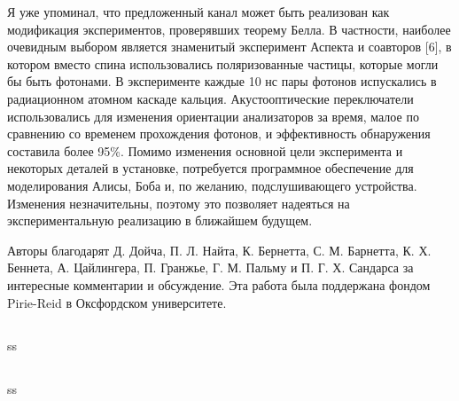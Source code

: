 Я уже упоминал, что предложенный канал может быть реализован как модификация экспериментов, проверявших теорему Белла. В частности, наиболее очевидным выбором является знаменитый эксперимент Аспекта и соавторов [6], в котором вместо спина использовались поляризованные частицы, которые могли бы быть фотонами. В эксперименте каждые 10 нс пары фотонов испускались в радиационном атомном каскаде кальция. Акустооптические переключатели использовались для изменения ориентации анализаторов за время, малое по сравнению со временем прохождения фотонов, и эффективность обнаружения составила более 95\%. Помимо изменения основной цели эксперимента и некоторых деталей в установке, потребуется программное обеспечение для моделирования Алисы, Боба и, по желанию, подслушивающего устройства. Изменения незначительны, поэтому это позволяет надеяться на экспериментальную реализацию в ближайшем будущем.

Авторы благодарят Д. Дойча, П. Л. Найта, К. Бернетта, С. М. Барнетта, К. Х. Беннета, А. Цайлингера, П. Гранжье, Г. М. Пальму и П. Г. Х. Сандарса за интересные комментарии и обсуждение. Эта работа была поддержана фондом Pirie-Reid в Оксфордском университете.


\subsection{\review}
ss
\subsection{\dic}
ss